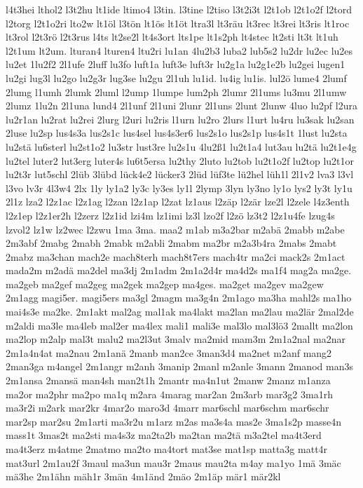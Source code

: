 {l4t3hei
lthol2
l3t2hu
lt1ide
ltimo4
l3tin.
l3tine
l2tiso
l3t2i3t
l2t1ob
l2t1o2f
l2tord
l2torg
l2t1o2ri
lto2w
lt1öl
l3tön
lt1ös
lt1öt
ltra3l
lt3räu
lt3rec
lt3rei
lt3ris
lt1roc
lt3rol
l2t3rö
l2t3rus
l4ts
lt2se2l
lt4s3ort
lts1pe
lt1s2ph
lt4stec
lt2sti
lt3t
lt1uh
l2t1um
lt2um.
lturan4
lturen4
ltu2ri
lu1an
4lu2b3
luba2
lub5s2
lu2dr
lu2ec
lu2es
lu2et
1lu2f2
2l1ufe
2luff
lu3fo
luft1a
luft3e
luft3r
lu2g1a
lu2g1e2b
lu2gei
lugen1
lu2gi
lug3l
lu2go
lu2g3r
lug3se
lu2gu
2l1uh
lu1id.
lu4ig
lu1is.
lul2ö
lume4
2lumf
2lumg
l1umh
2lumk
2luml
l2ump
1lumpe
lum2ph
2lumr
2l1ums
lu3mu
2l1umw
2lumz
1lu2n
2l1una
lund4
2l1unf
2l1uni
2lunr
2l1uns
2lunt
2lunw
4luo
lu2pf
l2ura
lu2r1an
lu2rat
lu2rei
2lurg
l2uri
lu2ris
l1urn
lu2ro
2lurs
l1urt
lu4ru
lu3sak
lu2san
2luse
lu2sp
lus4s3a
lus2s1c
lus4sel
lus4s3er6
lus2s1o
lus2s1p
lus4s1t
1lust
lu2sta
lu2stä
lu6sterl
lu2st1o2
lu3str
lust3re
lu2s1u
4lu2ß1
lu2t1a4
lut3au
lu2tä
lu2t1e4g
lu2tel
luter2
lut3erg
luter4s
lu6t5ersa
lu2thy
2luto
lu2tob
lu2t1o2f
lu2top
lu2t1or
lu2t3r
lut5schl
2lüb
3lübd
lück4e2
lücker3
2lüd
lüf3te
lü2hel
lüh1l
2l1v2
lva3
l3vl
l3vo
lv3r
4l3w4
2lx
1ly
ly1a2
ly3c
ly3es
ly1l
2lymp
3lyn
ly3no
ly1o
lys2
ly3t
ly1u
2l1z
lza2
l2z1ac
l2z1ag
l2zan
l2z1ap
l2zat
lz1aus
l2zäp
l2zär
lze2l
l2zele
l4z3enth
l2z1ep
l2z1er2h
l2zerz
l2z1id
lzi4m
lz1imi
lz3l
lzo2f
l2zö
lz3t2
l2z1u4fe
lzug4s
lzvol2
lz1w
lz2wec
l2zwu
1ma
3ma.
maa2
m1ab
m3a2bar
m2abä
2mabb
m2abe
2m3abf
2mabg
2mabh
2mabk
m2abli
2mabm
ma2br
m2a3b4ra
2mabs
2mabt
2mabz
ma3chan
mach2e
mach8terh
mach8t7ers
mach4tr
ma2ci
mack2s
2m1act
mada2m
m2adä
ma2del
ma3dj
2m1adm
2m1a2d4r
ma4d2s
ma1f4
mag2a
ma2ge.
ma2geb
ma2gef
ma2geg
ma2gek
ma2gep
ma4ges.
ma2get
ma2gev
ma2gew
2m1agg
magi5er.
magi5ers
ma3gl
2magm
ma3g4n
2m1ago
ma3ha
mahl2s
ma1ho
mai4s3e
ma2ke.
2m1akt
mal2ag
mal1ak
ma4lakt
ma2lan
ma2lau
ma2lär
2mal2de
m2aldi
ma3le
ma4leb
mal2er
ma4lex
mali1
mali3e
mal3lo
mal3lö3
2mallt
ma2lon
ma2lop
m2alp
mal3t
malu2
ma2l3ut
3malv
ma2mid
mam3m
2m1a2nal
ma2nar
2m1a4n4at
ma2nau
2m1anä
2manb
man2ce
3man3d4
ma2net
m2anf
mang2
2man3ga
m4angel
2m1angr
m2anh
3manip
2manl
m2anle
3mann
2manod
man3s
2m1ansa
2mansä
man4sh
man2t1h
2mantr
ma4n1ut
2manw
2manz
m1anza
ma2or
ma2phr
ma2po
ma1q
m2ara
4marag
mar2an
2m3arb
mar3g2
3ma1rh
ma3r2i
m2ark
mar2kr
4mar2o
maro3d
4marr
mar6schl
mar6schm
mar6schr
mar2sp
mar2su
2m1arti
ma3r2u
m1arz
m2as
ma3s4a
mas2e
3ma1s2p
masse4n
mass1t
3mas2t
ma2sti
ma4s3z
ma2ta2b
ma2tan
ma2tä
m3a2tel
ma4t3erd
ma4t3erz
m4atme
2matmo
ma2to
ma4tort
mat3se
mat1sp
matta3g
matt4r
mat3url
2m1au2f
3maul
ma3un
mau3r
2maus
mau2ta
m4ay
ma1yo
1mä
3mäc
mä3he
2m1ähn
mäh1r
3män
4m1änd
2mäo
2m1äp
mär1
mär2kl
}
